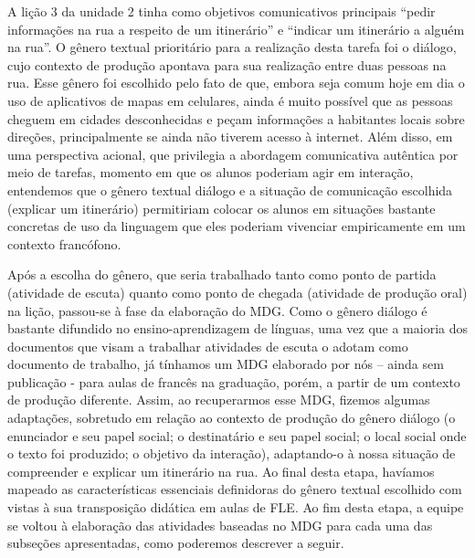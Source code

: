 A lição 3 da unidade 2 tinha como objetivos comunicativos principais
\enquote{pedir informações na rua a respeito de um itinerário} e \enquote{indicar um itinerário a alguém na rua}. O gênero textual prioritário para a realização desta tarefa foi o diálogo, cujo contexto de produção
apontava para sua realização entre duas pessoas na rua. Esse gênero foi
escolhido pelo fato de que, embora seja comum hoje em dia o uso de
aplicativos de mapas em celulares, ainda é muito possível que as pessoas
cheguem em cidades desconhecidas e peçam informações a habitantes locais
sobre direções, principalmente se ainda não tiverem acesso à internet.
Além disso, em uma perspectiva acional, que privilegia a abordagem
comunicativa autêntica por meio de tarefas, momento em que os alunos
poderiam agir em interação, entendemos que o gênero textual diálogo e a
situação de comunicação escolhida (explicar um itinerário) permitiriam
colocar os alunos em situações bastante concretas de uso da linguagem
que eles poderiam vivenciar empiricamente em um contexto francófono.

Após a escolha do gênero, que seria trabalhado tanto como ponto de
partida (atividade de escuta) quanto como ponto de chegada (atividade de
produção oral) na lição, passou-se à fase da elaboração do MDG. Como o
gênero diálogo é bastante difundido no ensino-aprendizagem de línguas,
uma vez que a maioria dos documentos que visam a trabalhar atividades de
escuta o adotam como documento de trabalho, já tínhamos um MDG elaborado
por nós -- ainda sem publicação - para aulas de francês na graduação,
porém, a partir de um contexto de produção diferente. Assim, ao
recuperarmos esse MDG, fizemos algumas adaptações, sobretudo em relação
ao contexto de produção \cite{bronckart_atividade_1999} do gênero diálogo (o
enunciador e seu papel social; o destinatário e seu papel social; o
local social onde o texto foi produzido; o objetivo da interação),
adaptando-o à nossa situação de compreender e explicar um itinerário na
rua. Ao final desta etapa, havíamos mapeado as características
essenciais definidoras do gênero textual escolhido com vistas à sua
transposição didática \cite{chevallard_transposition_1981} em aulas de FLE. Ao fim desta etapa, a equipe se voltou à elaboração das atividades baseadas no MDG
para cada uma das subseções apresentadas, como poderemos descrever a
seguir.

